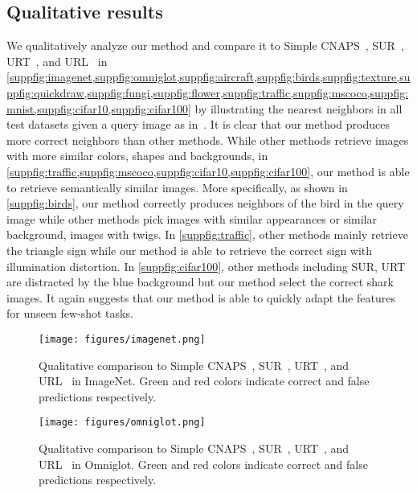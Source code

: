 \subsection{Qualitative results}
We qualitatively analyze our method and compare it to Simple CNAPS~\cite{bateni2020improved}, SUR~\cite{dvornik2020selecting}, URT~\cite{liu2020universal}, and URL~\cite{li2021universal} in \cref{suppfig:imagenet,suppfig:omniglot,suppfig:aircraft,suppfig:birds,suppfig:texture,suppfig:quickdraw,suppfig:fungi,suppfig:flower,suppfig:traffic,suppfig:mscoco,suppfig:mnist,suppfig:cifar10,suppfig:cifar100} by illustrating the nearest neighbors in all test datasets given a query image as in~\cite{li2021universal}.
It is clear that our method produces more correct neighbors than other methods. 
While other methods retrieve images with more similar colors, shapes and backgrounds, \eg in \cref{suppfig:traffic,suppfig:mscoco,suppfig:cifar10,suppfig:cifar100}, our method is able to retrieve semantically similar images.
More specifically, as shown in \cref{suppfig:birds}, our method correctly produces neighbors of the bird in the query image while other methods pick images with similar appearances or similar background, \eg images with twigs.
In \cref{suppfig:traffic}, other methods mainly retrieve the triangle sign while our method is able to retrieve the correct sign with illumination distortion. In \cref{suppfig:cifar100}, other methods including SUR, URT are distracted by the blue background but our method select the correct shark images. It again suggests that our method is able to quickly adapt the features for unseen few-shot tasks.


\begin{figure}[h!]
\begin{center}
\texttt{[image: figures/imagenet.png]}
\end{center}
\vspace{-0.3in}
\caption{Qualitative comparison to Simple CNAPS~\cite{bateni2020improved}, SUR~\cite{dvornik2020selecting}, URT~\cite{liu2020universal}, and URL~\cite{li2021universal} in ImageNet. Green and red colors indicate correct and false predictions respectively.}
\label{suppfig:imagenet}
\end{figure}

\begin{figure}[h!]
\begin{center}
\texttt{[image: figures/omniglot.png]}
\end{center}
\vspace{-0.3in}
\caption{Qualitative comparison to Simple CNAPS~\cite{bateni2020improved}, SUR~\cite{dvornik2020selecting}, URT~\cite{liu2020universal}, and URL~\cite{li2021universal} in Omniglot. Green and red colors indicate correct and false predictions respectively.}
\label{suppfig:omniglot}
\end{figure}

